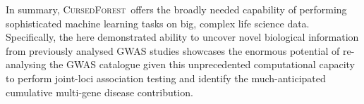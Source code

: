 \documentclass[10pt,letterpaper]{article}
\newcommand{\cursedforest}{\textsc{CursedForest}\xspace}
\begin{document}
In summary, \cursedforest\  offers the broadly needed capability of performing sophisticated machine learning tasks on big, complex life science data. Specifically, the here demonstrated ability to uncover novel biological information from previously analysed GWAS studies showcases the enormous potential of re-analysing the GWAS catalogue given this unprecedented computational capacity to perform joint-loci association testing and identify the much-anticipated cumulative multi-gene disease contribution.    

%
%
%
%
%
\end{document}
